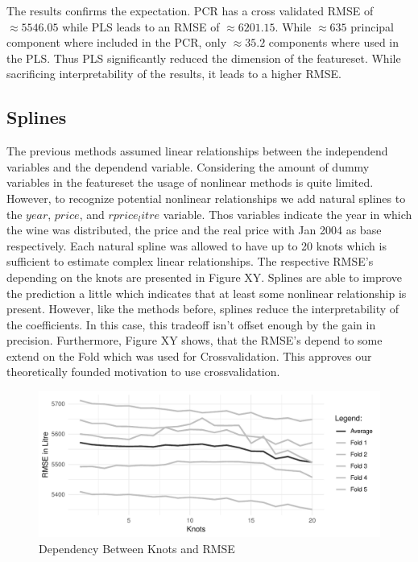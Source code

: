 \documentclass[11pt,]{article}
\begin{document}
The results confirms the expectation. PCR has a cross validated RMSE of
\(\approx 5546.05\) while PLS leads to an RMSE of \(\approx 6201.15\).
While \(\approx 635\) principal component where included in the PCR,
only \(\approx 35.2\) components where used in the PLS. Thus PLS
significantly reduced the dimension of the featureset. While sacrificing
interpretability of the results, it leads to a higher RMSE.

\hypertarget{splines}{%
\subsection{Splines}\label{splines}}

The previous methods assumed linear relationships between the
independend variables and the dependend variable. Considering the amount
of dummy variables in the featureset the usage of nonlinear methods is
quite limited. However, to recognize potential nonlinear relationships
we add natural splines to the \(year\), \(price\), and \(rprice_litre\)
variable. Thos variables indicate the year in which the wine was
distributed, the price and the real price with Jan 2004 as base
respectively. Each natural spline was allowed to have up to 20 knots
which is sufficient to estimate complex linear relationships. The
respective RMSE's depending on the knots are presented in Figure XY.
Splines are able to improve the prediction a little which indicates that
at least some nonlinear relationship is present. However, like the
methods before, splines reduce the interpretability of the coefficients.
In this case, this tradeoff isn't offset enough by the gain in
precision. Furthermore, Figure XY shows, that the RMSE's depend to some
extend on the Fold which was used for Crossvalidation. This approves our
theoretically founded motivation to use crossvalidation.

\begin{figure}
\centering
\includegraphics{../00_data/output_paper/08_splines.pdf}
\caption{Dependency Between Knots and RMSE}
\end{figure}
\end{document}

